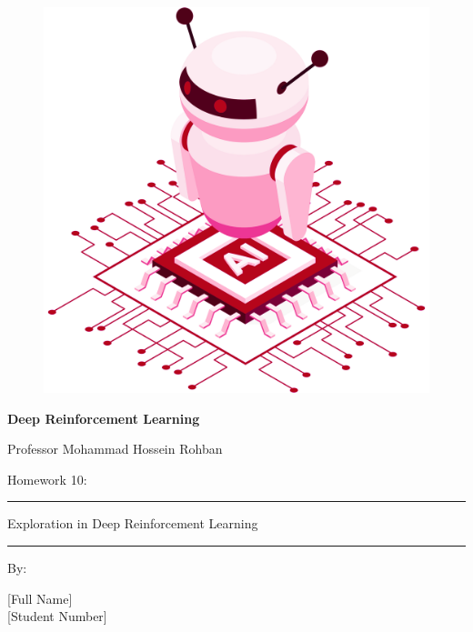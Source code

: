\documentclass[12pt]{article}
\begin{document}
\thispagestyle{plain}

\begin{center}

\vspace*{-1.5cm}
\begin{figure}[!h]
    \centering
    \includegraphics[width=0.7\linewidth]{figs/cover-std.png}
\end{figure}

{

{\color{DarkBlue} {\fontsize{30}{50} \textbf{
Deep Reinforcement Learning
}}}

{\color{DarkBlue} {\Large
Professor Mohammad Hossein Rohban
}}
}


\vspace{20pt}

{


{\color{RedOrange}
{\Large
Homework 10:
}\\
}
{\color{BrickRed}
\rule{12cm}{0.5pt}

{\Huge
Exploration in Deep Reinforcement Learning
}
\rule{12cm}{0.5pt}
}

\vspace{10pt}

{\color{RoyalPurple} { \small By:} } \\
\vspace{10pt}

{\color{Blue} { \LARGE [Full Name] } } \\
\vspace{5pt}
{\color{RoyalBlue} { \Large [Student Number] } }


}
\end{center}
\end{document}
